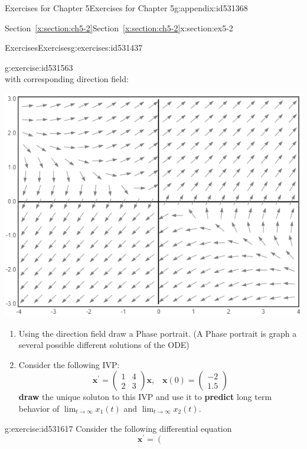\documentclass[oneside,10pt,]{book}
\newcommand{\xreffont}{\relax}
\newcommand{\terminology}[1]{\textbf{#1}}
\numberwithin{equation}{section}
\numberwithin{equation}{section}
\newcommand{\amp}{&}
\begin{document}
\begin{appendixptx}{Exercises for Chapter 5}{}{Exercises for Chapter 5}{}{}{g:appendix:id531368}
\begin{sectionptx}{Section~{\xreffont\ref*{x:section:ch5-2}}}{}{Section~{\xreffont\ref*{x:section:ch5-2}}}{}{}{x:section:ex5-2}
\begin{exercises-subsection-numberless}{Exercises}{}{Exercises}{}{}{g:exercises:id531437}
\begin{divisionexercise}{7}{}{}{g:exercise:id531563}
\begin{equation*}
\end{equation*}
with corresponding direction field: \begin{image}{0}{1}{0}%
\includegraphics[width=\linewidth]{images/HW5-2-1.png}
\end{image}%
%
%
\begin{enumerate}[label=(\alph*)]
\item{}Using the direction field draw a Phase portrait. (A Phase portrait is graph a several possible different solutions of the ODE)%
\item{}Consider the following IVP:%
\begin{equation*}
\mathbf{x}^{\prime}=\left(\begin{array}{cc}
1 \amp 4\\
2 \amp 3
\end{array}\right)\mathbf{x},\,\,\,\,\,\mathbf{x}(0)=\left(\begin{array}{c}
-2\\
1.5
\end{array}\right)
\end{equation*}
\terminology{draw} the unique soluton to this IVP and use it to \terminology{predict} long term behavior of \(\lim_{t\to\infty}x_{1}(t)\) and \(\lim_{t\to\infty}x_{2}(t)\).%
\end{enumerate}
\end{divisionexercise}%
\begin{divisionexercise}{8}{}{}{g:exercise:id531617}%
Consider the following differential equation%
\begin{equation*}
\mathbf{x}^{\prime}=\left(\begin{array}{cc}

\end{array}
\end{equation*}
\end{divisionexercise}
\end{exercises-subsection-numberless}
\end{sectionptx}
\end{appendixptx}
\end{document}
